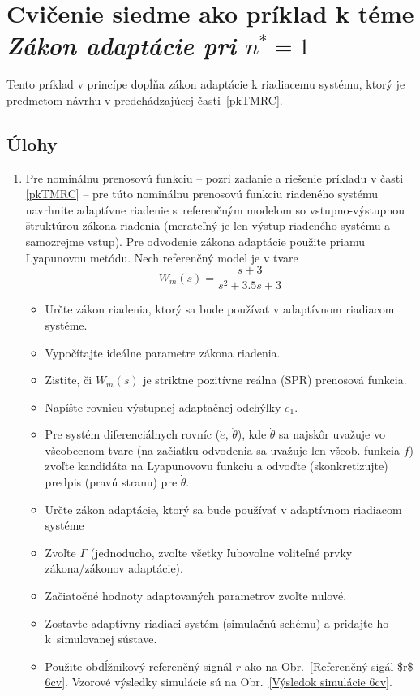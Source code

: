 \documentclass[a4paper, 10pt, ]{article}
\begin{document}
\section{Cvičenie siedme ako príklad k téme \emph{Zákon adaptácie pri $n^* = 1$}}




Tento príklad v princípe dopĺňa zákon adaptácie k riadiacemu systému, ktorý je predmetom návrhu v predchádzajúcej časti~\ref{pkTMRC}.



\subsection{Úlohy}


\begin{enumerate}[leftmargin=0pt, labelsep=4mm, itemsep=0pt]



	\item Pre nominálnu prenosovú funkciu -- pozri zadanie a riešenie príkladu v časti \ref{pkTMRC} -- pre túto nominálnu prenosovú funkciu riadeného systému navrhnite adaptívne riadenie s~referenčným modelom so vstupno-výstupnou štruktúrou zákona riadenia (merateľný je len výstup riadeného systému a samozrejme vstup). Pre odvodenie zákona adaptácie použite priamu Lyapunovou metódu. Nech referenčný model je v tvare
	\begin{equation}
		W_m(s) = \frac{s + 3}{ s^2 + 3.5 s + 3}
	\end{equation}

	\begin{itemize}[leftmargin=0pt, labelsep=4mm, itemsep=0pt]
		\item Určte zákon riadenia, ktorý sa bude používať v adaptívnom riadiacom systéme.
		\item Vypočítajte ideálne parametre zákona riadenia.
		\item Zistite, či $W_m(s)$ je striktne pozitívne reálna (SPR) prenosová funkcia.
		\item Napíšte rovnicu výstupnej adaptačnej odchýlky $e_1$.
		\item Pre systém diferenciálnych rovníc ($\dot e$, $\dot \theta$), kde $\dot \theta$ sa najskôr uvažuje vo všeobecnom tvare (na začiatku odvodenia sa uvažuje len všeob. funkcia $f$) zvoľte kandidáta na Lyapunovovu funkciu a odvoďte (skonkretizujte) predpis (pravú stranu) pre $\dot \theta$.
		\item Určte zákon adaptácie, ktorý sa bude používať v adaptívnom riadiacom systéme
		\item Zvoľte $\Gamma$ (jednoducho, zvoľte všetky ľubovolne voliteľné prvky zákona/zákonov adaptácie).
		\item Začiatočné hodnoty adaptovaných parametrov zvoľte nulové.
		\item Zostavte adaptívny riadiaci systém (simulačnú schému) a pridajte ho k~simulovanej sústave.
		\item Použite obdĺžnikový referenčný signál $r$ ako na Obr.~\ref{Referenčný sigál $r$ 6cv}. Vzorové výsledky simulácie sú na Obr.~\ref{Výsledok simulácie 6cv}.
	\end{itemize}

\end{enumerate}
\end{document}
